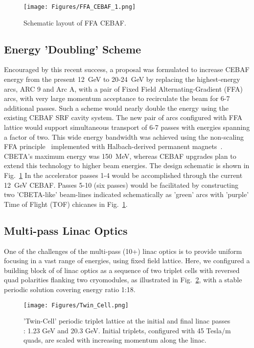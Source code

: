 %
%
\begin{figure}[tbh]
  \centering
  \texttt{[image: Figures/FFA\_CEBAF\_1.png]}
  \caption{Schematic layout of FFA CEBAF.}
  \label{fig:FFA_CEBAF}
\end{figure}
%
\subsection{Energy 'Doubling' Scheme}




Encouraged by this recent success, a proposal was formulated to increase CEBAF energy from the present 12~GeV to 20-24~GeV by replacing the highest-energy arcs, ARC 9 and Arc A, with a pair of Fixed Field Alternating-Gradient (FFA) arcs, with very large momentum acceptance to recirculate the beam for 6-7 additional passes. Such a scheme would nearly double the energy using the existing CEBAF SRF cavity system. The new pair of arcs configured with FFA lattice would support simultaneous transport of 6-7 passes with energies spanning a factor of two. This wide energy bandwidth was achieved using the non-scaling FFA principle~\cite{Trbojevic-NSFFA:2018bde} implemented with Halbach-derived permanent magnets~\cite{CBETAmagnets:2018bde}.  CBETA's maximum energy was 150~MeV, whereas CEBAF upgrades plan to extend this technology to higher beam energies. 
The design schematic is shown in Fig.~\ref{fig:FFA_CEBAF} In the accelerator passes 1-4 would be accomplished through the current 12~GeV CEBAF. Passes 5-10 (six passes) would be facilitated by constructing two 'CBETA-like' beam-lines indicated schematically as 'green' arcs with 'purple' Time of Flight (TOF) chicanes in Fig.~\ref{fig:FFA_CEBAF}. 
%
%
\subsection{Multi-pass Linac Optics}
One of the challenges of  the multi-pass (10+) linac optics is to provide uniform focusing in a vast range of energies, using fixed field lattice. Here, we configured a building block of of linac optics as a sequence of two triplet cells with reversed quad polarities flanking two cryomodules, as illustrated in Fig.~\ref{fig:Twin_Cell}, with a stable periodic solution covering energy ratio 1:18.
%
\begin{figure}[ht]
  \centering
  \texttt{[image: Figures/Twin\_Cell.png]}
  \caption{'Twin-Cell' periodic triplet lattice at the initial and final linac passes : 1.23 GeV and 20.3 GeV. Initial triplets, configured with 45 Tesla/m quads, are scaled with increasing momentum along the linac.}
  \label{fig:Twin_Cell}
\end{figure}
%
